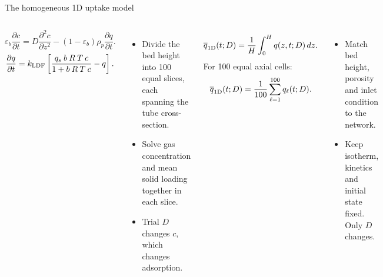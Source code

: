 \begin{frame}{The homogeneous 1D uptake model}
\setlength{\abovedisplayskip}{7pt}\setlength{\belowdisplayskip}{7pt}
\begin{columns}[T,onlytextwidth]
\small
{}
\[
\varepsilon_b\frac{\partial c}{\partial t}
=D\frac{\partial^2c}{\partial z^2}
-(1-\varepsilon_b)\rho_p\frac{\partial q}{\partial t}.
\]
\[
\frac{\partial q}{\partial t}
=k_{\rm LDF}\left[\frac{q_s\:b\:R\:T\:c}{1+b\:R\:T\:c}-q\right].
\]

\vspace*{-0.2cm}
\begin{itemize}\setlength{\itemsep}{2pt}
\item Divide the bed height into 100 equal slices, each spanning the tube cross-section.
\item Solve gas concentration and mean solid loading together in each slice.
\item Trial $D$ changes $c$, which changes adsorption.
\end{itemize}
\small
{}
\[
\overline q_{\rm 1D}(t;D)=\frac{1}{H}\int_0^H q(z,t;D)\,dz.
\]
For 100 equal axial cells:
\[
\overline q_{\rm 1D}(t;D)=\frac{1}{100}\sum_{\ell=1}^{100}q_\ell(t;D).
\]

\vspace*{-0.3cm}
\begin{itemize}\setlength{\itemsep}{2pt}
\item Match bed height, porosity and inlet condition to the network.
\item Keep isotherm, kinetics and initial state fixed. Only $D$ changes.
\end{itemize}
\end{columns}
\vspace{-0.1cm}

\end{frame}

